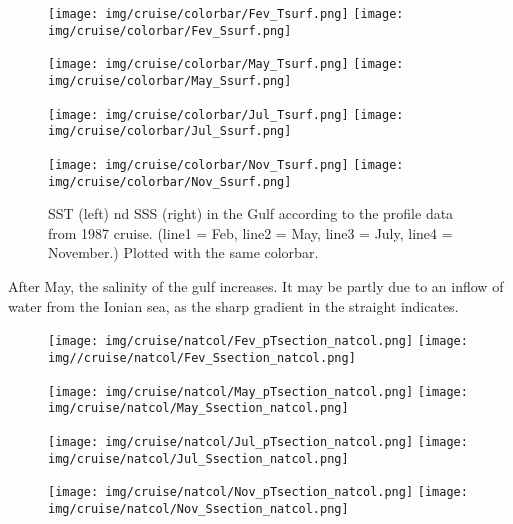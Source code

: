 \documentclass[english]{PFeENSTA}
\begin{document}
{\begin{figure}[H]
	\begin{minipage}[h!]{1\linewidth}
		\centering
		\texttt{[image: img/cruise/colorbar/Fev\_Tsurf.png]}
		\texttt{[image: img/cruise/colorbar/Fev\_Ssurf.png]}
	\end{minipage}
	\begin{minipage}[h!]{1\linewidth}
		\centering
		\texttt{[image: img/cruise/colorbar/May\_Tsurf.png]}
		\texttt{[image: img/cruise/colorbar/May\_Ssurf.png]}
	\end{minipage} 
	\begin{minipage}[h!]{1\linewidth}
		\centering
		\texttt{[image: img/cruise/colorbar/Jul\_Tsurf.png]}
		\texttt{[image: img/cruise/colorbar/Jul\_Ssurf.png]}
	\end{minipage} 
	\begin{minipage}[h!]{1\linewidth}
		\centering
		\texttt{[image: img/cruise/colorbar/Nov\_Tsurf.png]}
		\texttt{[image: img/cruise/colorbar/Nov\_Ssurf.png]}
	\end{minipage} 
   \caption{\label{fig:profiles_SST_SSS_colorbar} SST (left) nd SSS (right)  in the Gulf according to the profile data from 1987 cruise. (line1 = Feb, line2 = May, line3 = July, line4 = November.) Plotted with the same colorbar.}
\end{figure}

After May, the salinity of the gulf increases. It may be partly due to an inflow of water from the Ionian sea, as the sharp gradient in the straight indicates. 

\begin{figure}[H]
   \begin{minipage}[h!]{1\linewidth}
	\centering
	\texttt{[image: img/cruise/natcol/Fev\_pTsection\_natcol.png]}
	\texttt{[image: img//cruise/natcol/Fev\_Ssection\_natcol.png]}
   \end{minipage}
   \begin{minipage}[h!]{1\linewidth}
	\centering
	\texttt{[image: img/cruise/natcol/May\_pTsection\_natcol.png]}
	\texttt{[image: img/cruise/natcol/May\_Ssection\_natcol.png]}
   \end{minipage}
   \begin{minipage}[h!]{1\linewidth}
	\centering
	\texttt{[image: img/cruise/natcol/Jul\_pTsection\_natcol.png]}
	\texttt{[image: img/cruise/natcol/Jul\_Ssection\_natcol.png]}
   \end{minipage}
   \begin{minipage}[h!]{1\linewidth}
	\centering
	\texttt{[image: img/cruise/natcol/Nov\_pTsection\_natcol.png]}
	\texttt{[image: img/cruise/natcol/Nov\_Ssection\_natcol.png]}
   \end{minipage} 
   

\end{figure}}
\end{document}
